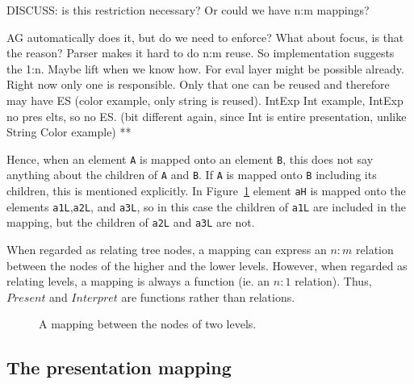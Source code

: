 DISCUSS: is this restriction necessary? Or could we have n:m mappings?

AG automatically does it, but do we need to enforce? What about focus, is that the reason?
Parser makes it hard to do n:m reuse. So implementation suggests the 1:n. Maybe lift when we know how. For eval layer might be possible already. Right now only one is responsible.  Only that one can be reused and therefore may have ES (color example, only string is reused). IntExp Int example, IntExp no pres elts, so no ES. (bit different again, since Int is entire presentation, unlike String Color example) 
**
\fromHere  %


\bc
Hence, when an element \verb|A| is mapped onto an element \verb|B|, this does not say anything about the children of \verb|A| and \verb|B|. If \verb|A| is mapped onto \verb|B| including its children, this is mentioned explicitly. In Figure~\ref{nodeMapping} element \verb|aH| is mapped onto the elements \verb|a1L|,\verb|a2L|, and \verb|a3L|, so in this case the children of \verb|a1L| are included in the mapping, but the children of \verb|a2L| and \verb|a3L| are not. 
\ec

\bc
When regarded as relating tree nodes, a mapping can express an $n:m$ relation between the nodes of the higher and the lower levels. However, when regarded as relating levels, a mapping is always a function (ie. an $n:1$ relation). Thus, $Present$ and $Interpret$ are functions rather than relations.
\ec

\begin{figure}
\begin{center}
\begin{center}
\end{center}
\caption{A mapping between the nodes of two levels.}\label{nodeMapping} 
\end{center}
\end{figure}



%																
\subsection{The presentation mapping}

